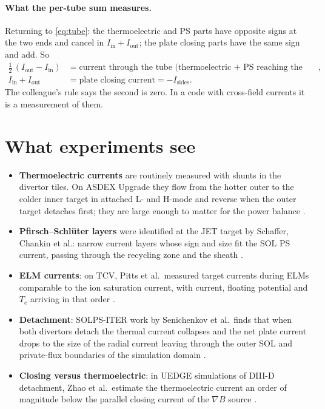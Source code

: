 \documentclass[11pt,a4paper]{article}
\newcommand{\Te}{T_e}
\begin{document}
\paragraph{What the per-tube sum measures.} Returning to \eqref{eq:tube}: the thermoelectric and PS parts have opposite
signs at the two ends and cancel in $I_{\mathrm{in}} + I_{\mathrm{out}}$; the plate closing parts have the same sign and
add. So
\begin{equation}
\begin{aligned}
  \tfrac12\,(I_{\mathrm{out}} - I_{\mathrm{in}}) &= \text{current through the tube (thermoelectric + PS reaching the plates)},\\
  I_{\mathrm{in}} + I_{\mathrm{out}} &= \text{plate closing current} = -I_{\mathrm{sides}} .
\end{aligned}
\label{eq:decomp}
\end{equation}
The colleague's rule says the second is zero. In a code with cross-field currents it is a measurement of them.

\section{What experiments see}

\begin{itemize}
\item \textbf{Thermoelectric currents} are routinely measured with shunts in the divertor tiles. On ASDEX Upgrade they
      flow from the hotter outer to the colder inner target in attached L- and H-mode and reverse when the outer target
      detaches first; they are large enough to matter for the power balance \cite{kallenbach}.
\item \textbf{Pfirsch--Schl\"uter layers} were identified at the JET target by Schaffer, Chankin et al.: narrow current
      layers whose sign and size fit the SOL PS current, passing through the recycling zone and the sheath
      \cite{schaffer}.
\item \textbf{ELM currents}: on TCV, Pitts et al.\ measured target currents during ELMs comparable to the ion saturation
      current, with current, floating potential and $\Te$ arriving in that order \cite{pitts}.
\item \textbf{Detachment}: SOLPS-ITER work by Senichenkov et al.\ finds that when both divertors detach the thermal
      current collapses and the net plate current drops to the size of the radial current leaving through the outer SOL
      and private-flux boundaries of the simulation domain \cite{senichenkov}.
\item \textbf{Closing versus thermoelectric}: in UEDGE simulations of DIII-D detachment, Zhao et al.\ estimate the
      thermoelectric current an order of magnitude below the parallel closing current of the $\nabla B$ source
      \cite{zhao2026}.
\end{itemize}
\end{document}
